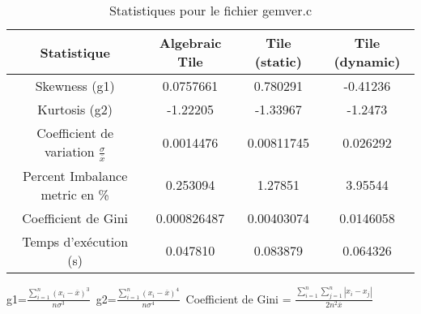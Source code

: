 \documentclass{article}
\begin{document}
\begin{table}[htbp]
  \centering
  \caption{Statistiques pour le fichier gemver.c}
  \begin{tabular}{|c|c|c|c|}
    \hline
    Statistique & Algebraic Tile & Tile (static) & Tile (dynamic) \\ 
    \hline
    Skewness (g1)  & 0.0757661 & 0.780291 & -0.41236 \\ 
    Kurtosis (g2)  & -1.22205 & -1.33967 & -1.2473 \\ 
    Coefficient de variation $ \frac{\sigma}{\overline{x}} $ & 0.0014476 & 0.00811745 & 0.026292\\ 
    Percent Imbalance metric en \% & 0.253094 & 1.27851 & 3.95544\\ 
    Coefficient de Gini  & 0.000826487 & 0.00403074 & 0.0146058\\ 
    Temps d'exécution (s) &  0.047810    &  0.083879   &  0.064326   \\ 

    \hline
  \end{tabular}
\end{table}\newline
g1=$ \frac{\sum_{i=1}^{n} (x_i - \overline{x})^3}{n\sigma^3} $\
g2=$ \frac{\sum_{i=1}^{n} (x_i - \overline{x})^4}{n\sigma^4} $\
Coefficient de Gini = $ \frac{\sum_{i=1}^{n}\sum_{j=1}^{n} |x_i - x_j|}{2n^2\overline{x}} $\
\newpage
\end{document}
